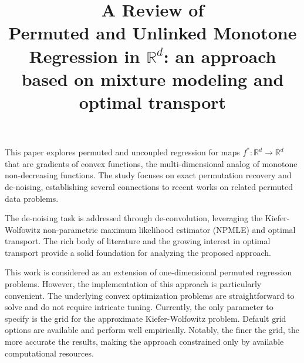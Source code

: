 \documentclass[11pt]{article}
\title{A Review of \\ Permuted and Unlinked Monotone Regression in
	$\mathbb{R}^d$: an approach based on mixture modeling and optimal transport}
\begin{document}
	\maketitle	
	

This paper explores permuted and uncoupled regression for maps $f^* : \mathbb{R}^d \to \mathbb{R}^d$
that are gradients of convex functions, the multi-dimensional analog of monotone non-decreasing functions. The study focuses on exact permutation recovery and de-noising, establishing several connections to recent works on related permuted data problems.

The de-noising task is addressed through de-convolution, leveraging the Kiefer-Wolfowitz non-parametric maximum likelihood estimator (NPMLE) and optimal transport. The rich body of literature and the growing interest in optimal transport provide a solid foundation for analyzing the proposed approach.

This work is considered as an extension of one-dimensional permuted regression problems. However, the implementation of this approach is particularly convenient. The underlying convex optimization problems are straightforward to solve and do not require intricate tuning. Currently, the only parameter to specify is the grid for the approximate Kiefer-Wolfowitz problem. Default grid options are available and perform well empirically. Notably, the finer the grid, the more accurate the results, making the approach constrained only by available computational resources.
	
\end{document}
